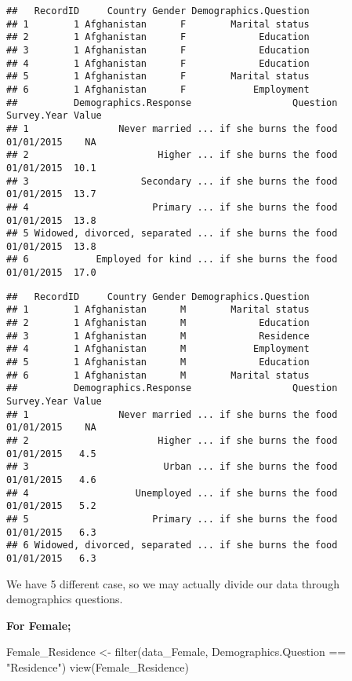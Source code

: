 \documentclass[
]{article}
\newenvironment{Shaded}{\begin{snugshade}}{\end{snugshade}}
\newcommand{\FunctionTok}[1]{\textcolor[rgb]{0.00,0.00,0.00}{#1}}
\newcommand{\NormalTok}[1]{#1}
\newcommand{\OtherTok}[1]{\textcolor[rgb]{0.56,0.35,0.01}{#1}}
\newcommand{\SpecialCharTok}[1]{\textcolor[rgb]{0.00,0.00,0.00}{#1}}
\newcommand{\StringTok}[1]{\textcolor[rgb]{0.31,0.60,0.02}{#1}}
\begin{document}
\begin{verbatim}
##   RecordID     Country Gender Demographics.Question
## 1        1 Afghanistan      F        Marital status
## 2        1 Afghanistan      F             Education
## 3        1 Afghanistan      F             Education
## 4        1 Afghanistan      F             Education
## 5        1 Afghanistan      F        Marital status
## 6        1 Afghanistan      F            Employment
##          Demographics.Response                  Question Survey.Year Value
## 1                Never married ... if she burns the food  01/01/2015    NA
## 2                       Higher ... if she burns the food  01/01/2015  10.1
## 3                    Secondary ... if she burns the food  01/01/2015  13.7
## 4                      Primary ... if she burns the food  01/01/2015  13.8
## 5 Widowed, divorced, separated ... if she burns the food  01/01/2015  13.8
## 6            Employed for kind ... if she burns the food  01/01/2015  17.0
\end{verbatim}

\begin{verbatim}
##   RecordID     Country Gender Demographics.Question
## 1        1 Afghanistan      M        Marital status
## 2        1 Afghanistan      M             Education
## 3        1 Afghanistan      M             Residence
## 4        1 Afghanistan      M            Employment
## 5        1 Afghanistan      M             Education
## 6        1 Afghanistan      M        Marital status
##          Demographics.Response                  Question Survey.Year Value
## 1                Never married ... if she burns the food  01/01/2015    NA
## 2                       Higher ... if she burns the food  01/01/2015   4.5
## 3                        Urban ... if she burns the food  01/01/2015   4.6
## 4                   Unemployed ... if she burns the food  01/01/2015   5.2
## 5                      Primary ... if she burns the food  01/01/2015   6.3
## 6 Widowed, divorced, separated ... if she burns the food  01/01/2015   6.3
\end{verbatim}

We have 5 different case, so we may actually divide our data through
demographics questions.

\textbf{For Female;}

\begin{Shaded}
\begin{Highlighting}[]
\NormalTok{  Female\_Residence }\OtherTok{\textless{}{-}} \FunctionTok{filter}\NormalTok{(data\_Female, Demographics.Question }\SpecialCharTok{==} \StringTok{"Residence"}\NormalTok{)}
  \FunctionTok{view}\NormalTok{(Female\_Residence)}
\end{Highlighting}
\end{Shaded}
\end{document}
